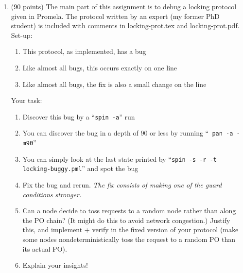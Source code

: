 \documentclass[11pt]{article}
\begin{document}
\begin{enumerate}
\item (90 points)
  The main part of this assignment is to debug a locking protocol given in
  Promela. The protocol written by an expert (my former PhD student) is included
  with comments in locking-prot.tex and locking-prot.pdf.
  Set-up:
  \begin{enumerate}
  \item This protocol, as implemented, has a bug
  \item Like almost all bugs, this occurs exactly on one line
  \item Like almost all bugs, the fix is also a small change on the line
  \end{enumerate}
  Your task:
  \begin{enumerate}
  \item Discover this bug by a ``{\tt spin -a}'' run
  \item You can discover the bug in a depth of 90 or less by running  ``{\tt
    pan -a -m90}'' 
  \item You can simply look at the last state printed by
    ``{\tt spin  -s -r -t locking-buggy.pml}'' and spot the bug
  \item Fix the bug and rerun. {\em The fix consists of making one of the guard conditions stronger.}
  \item Can a node decide to toss  requests to a random node rather than along the PO chain?
    (It might do this to avoid network congestion.) Justify this, and implement + verify in
    the fixed version of your protocol (make some nodes nondeterministically toss the
    request to a random PO than its actual PO).
  \item Explain your insights!
  \end{enumerate}  


\begin{minipage}{\minpagw}
\end{minipage}  
\end{enumerate}
\end{document}
